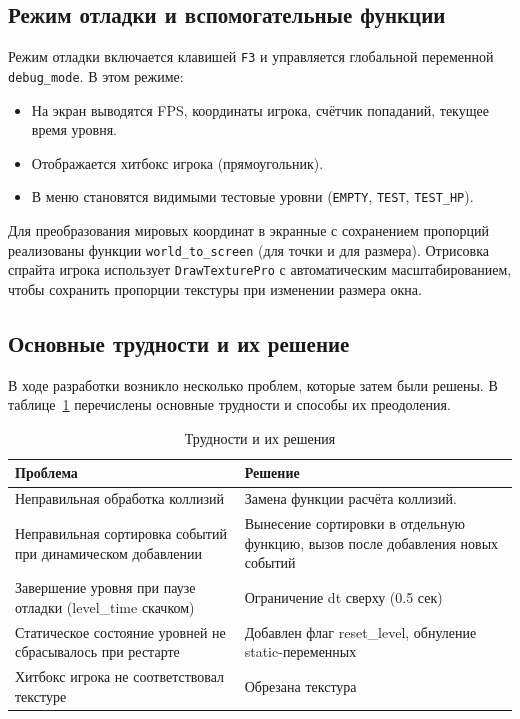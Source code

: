 \documentclass[../main.tex]{subfiles}
\begin{document}

\subsection{Режим отладки и вспомогательные функции}

Режим отладки включается клавишей \texttt{F3} и управляется глобальной переменной \texttt{debug\_mode}. В этом режиме:
\begin{itemize}
	\item На экран выводятся FPS, координаты игрока, счётчик попаданий, текущее время уровня.
	\item Отображается хитбокс игрока (прямоугольник).
	\item В меню становятся видимыми тестовые уровни (\texttt{EMPTY}, \texttt{TEST}, \texttt{TEST\_HP}).
\end{itemize}

Для преобразования мировых координат в экранные с сохранением пропорций реализованы функции \texttt{world\_to\_screen} (для точки и для размера). Отрисовка спрайта игрока использует \texttt{DrawTexturePro} с автоматическим масштабированием, чтобы сохранить пропорции текстуры при изменении размера окна.

\subsection{Основные трудности и их решение}

В ходе разработки возникло несколько проблем, которые затем были решены. В таблице~\ref{tab:difficulties} перечислены основные трудности и способы их преодоления.

\begin{table}[H]
	\centering
	\caption{Трудности и их решения}
	\label{tab:difficulties}
	\begin{tabularx}{\textwidth}{|X|X|}
		\hline
		\textbf{Проблема} & \textbf{Решение} \\
		\hline
		Неправильная обработка коллизий & Замена функции расчёта коллизий. \\
		\hline
		Неправильная сортировка событий при динамическом добавлении & Вынесение сортировки в отдельную функцию, вызов после добавления новых событий \\
		\hline
		Завершение уровня при паузе отладки (level\_time скачком) & Ограничение dt сверху (0.5 сек) \\
		\hline
		Статическое состояние уровней не сбрасывалось при рестарте & Добавлен флаг reset\_level, обнуление static-переменных \\
		\hline
		Хитбокс игрока не соответствовал текстуре & Обрезана текстура \\
		\hline
	\end{tabularx}
\end{table}
\end{document}
